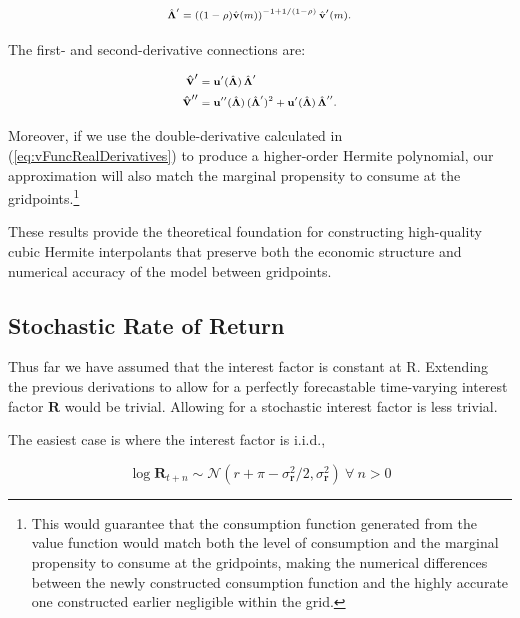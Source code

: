 \documentclass[preprint,authoryear]{elsarticle}
\newcommand{\uFunc}{\mathbf{u}}
\newcommand{\CRRA}{\rho}
\newcommand{\Rfree}{\text{R}}
\newcommand{\mNrm}{m}
\newcommand{\vFunc}{\mathbf{v}}
\newcommand{\uPrime}{\uFunc'}
\newcommand{\vInv}{{\scriptsize \boldsymbol{\Lambda}}}
\newcommand{\vInvReal}{\hat{\vInv}}
\newcommand{\vFuncReal}{\hat{\vFunc}}
\newcommand{\vInvRealDeriv}{\vInvReal'}
\newcommand{\vFuncRealDeriv}{\vFuncReal'}
\newcommand{\uDoublePrime}{\uFunc''}
\newcommand{\vFuncRealDerivSecond}{\vFuncReal''}
\newcommand{\vInvRealDerivSecond}{\vInvReal''}
\newcommand{\Risky}{\mathbf{R}}
\newcommand{\Nrml}{\mathcal{N}}
\newcommand{\std}{\sigma}
\newcommand{\risky}{\mathbf{r}}
\newcommand{\equityPrem}{\pi}
\begin{document}
\begin{equation}
\label{eq:vInvRealDeriv}
\vInvRealDeriv = \left( (1-\CRRA) \vFuncReal(\mNrm)\right)^{-1+1/(1-\CRRA)}  \vFuncRealDeriv(\mNrm).
\end{equation}

The first- and second-derivative connections are:

\begin{equation}
\label{eq:vFuncRealDerivatives}
\begin{aligned}
\vFuncRealDeriv &= \uPrime(\vInvReal) \, \vInvRealDeriv \\
\vFuncRealDerivSecond &= \uDoublePrime(\vInvReal) \, (\vInvRealDeriv)^2 + \uPrime(\vInvReal) \, \vInvRealDerivSecond.
\end{aligned}
\end{equation}

Moreover, if we use the double-derivative calculated in (\ref{eq:vFuncRealDerivatives}) to produce a higher-order Hermite polynomial, our approximation will also match the marginal propensity to consume at the gridpoints.\footnote{This would guarantee that the consumption function generated from the value function would match both the level of consumption and the marginal propensity to consume at the gridpoints, making the numerical differences between the newly constructed consumption function and the highly accurate one constructed earlier negligible within the grid.}

These results provide the theoretical foundation for constructing high-quality cubic Hermite interpolants that preserve both the economic structure and numerical accuracy of the model between gridpoints.

\subsection{Stochastic Rate of Return}

Thus far we have assumed that the interest factor is constant at $\Rfree$.
Extending the previous derivations to allow for a perfectly forecastable
time-varying interest factor $\Risky$ would be trivial. Allowing for a
stochastic interest factor is less trivial.

The easiest case is where the interest factor is i.i.d.,

\begin{equation}
\label{eq:distRisky}
\log \Risky_{t+n} \sim \Nrml(r + \equityPrem - \std^{2}_{\risky}/2,\std^{2}_{\risky}) ~\forall~n>0
\end{equation}
\end{document}
